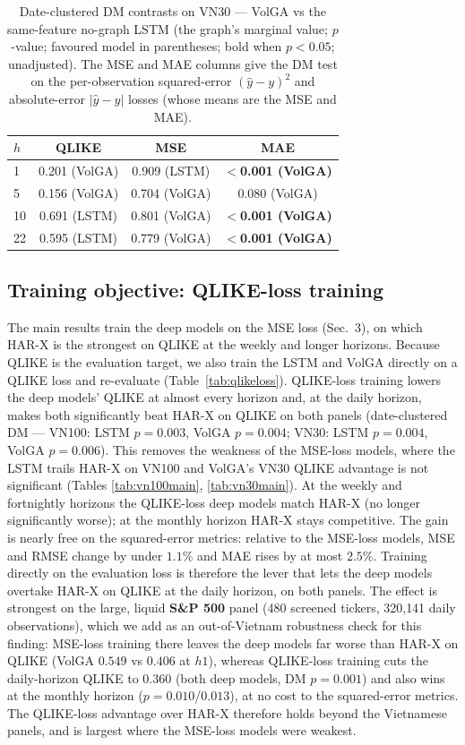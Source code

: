 \documentclass{llncs}
\begin{document}
\begin{table}[t]
\centering
\caption{Date-clustered DM contrasts on VN30 --- VolGA vs the same-feature no-graph LSTM (the graph's
marginal value; $p$-value; favoured model in parentheses; bold when $p<0.05$; unadjusted). The MSE and MAE columns give the DM test on the per-observation squared-error $(\hat{y}-y)^2$ and absolute-error $|\hat{y}-y|$ losses (whose means are the MSE and MAE).}
\label{tab:dm-vn30-lstm}
\footnotesize
\setlength{\tabcolsep}{8pt}
\begin{tabular}{lccc}
\toprule
$h$ & QLIKE & MSE & MAE \\
\midrule
1 & 0.201 (VolGA) & 0.909 (LSTM) & \textbf{$<$0.001 (VolGA)} \\
5 & 0.156 (VolGA) & 0.704 (VolGA) & 0.080 (VolGA) \\
10 & 0.691 (LSTM) & 0.801 (VolGA) & \textbf{$<$0.001 (VolGA)} \\
22 & 0.595 (LSTM) & 0.779 (VolGA) & \textbf{$<$0.001 (VolGA)} \\
\bottomrule
\end{tabular}
\end{table}

\subsection{Training objective: QLIKE-loss training}\label{sec:qlikeloss}
The main results train the deep models on the MSE loss (Sec.~3), on which HAR-X is the strongest on
QLIKE at the weekly and longer horizons. Because QLIKE is the evaluation target, we also train the
LSTM and VolGA directly on a QLIKE loss and re-evaluate (Table~\ref{tab:qlikeloss}). QLIKE-loss
training lowers the deep models' QLIKE at almost every horizon and, at the daily horizon, makes both
significantly beat HAR-X on QLIKE on both panels (date-clustered DM --- VN100: LSTM $p=0.003$, VolGA
$p=0.004$; VN30: LSTM $p=0.004$, VolGA $p=0.006$). This removes the weakness of the MSE-loss models,
where the LSTM trails HAR-X on VN100 and VolGA's VN30 QLIKE advantage is not significant (Tables
\ref{tab:vn100main}, \ref{tab:vn30main}). At the weekly and fortnightly horizons the QLIKE-loss deep
models match HAR-X (no longer significantly worse); at the monthly horizon HAR-X stays competitive.
The gain is nearly free on the squared-error metrics: relative to the MSE-loss models, MSE and RMSE
change by under $1.1\%$ and MAE rises by at most $2.5\%$. Training directly on the evaluation loss is
therefore the lever that lets the deep models overtake HAR-X on QLIKE at the daily horizon, on both
panels. The effect is strongest on the large, liquid \textbf{S\&P 500} panel (480 screened tickers,
320{,}141 daily observations), which we add as an out-of-Vietnam robustness check for this finding:
MSE-loss training there leaves the deep models far worse than HAR-X on QLIKE (VolGA $0.549$ vs
$0.406$ at $h1$), whereas QLIKE-loss training cuts the daily-horizon QLIKE to $0.360$ (both deep
models, DM $p=0.001$) and also wins at the monthly horizon ($p=0.010$/$0.013$), at no cost to the
squared-error metrics. The QLIKE-loss advantage over HAR-X therefore holds beyond the Vietnamese
panels, and is largest where the MSE-loss models were weakest.
\end{document}
